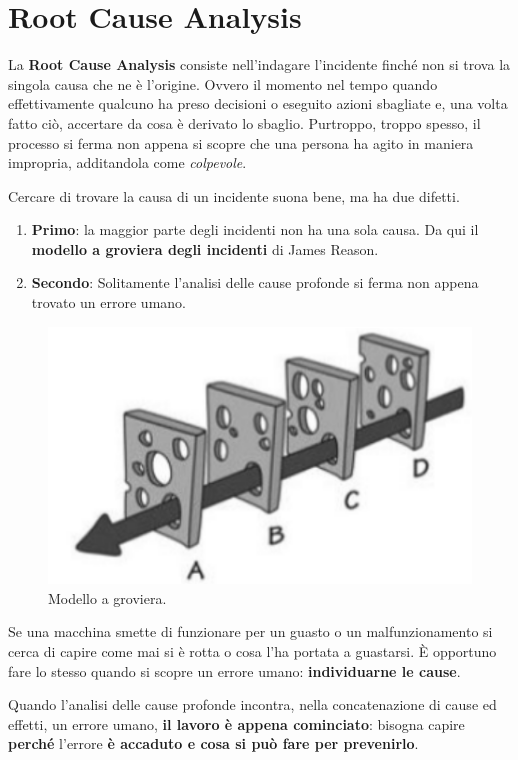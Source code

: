 \documentclass[a4paper,11pt,oneside]{book}
\begin{document}
\section{Root Cause Analysis}
La \textbf{Root Cause Analysis} consiste nell'indagare l'incidente finché non si trova la singola causa che ne è l'origine. Ovvero il momento nel tempo quando effettivamente qualcuno ha preso decisioni o eseguito azioni sbagliate e,
una volta fatto ciò, accertare da cosa è derivato lo sbaglio. Purtroppo, troppo spesso, il processo si ferma non appena si scopre che una persona ha agito in maniera impropria, additandola come \textit{colpevole}.

Cercare di trovare la causa di un incidente suona bene, ma ha due difetti.

\begin{enumerate}
	\item \textbf{Primo}: la maggior parte degli incidenti non ha una sola causa. Da qui il \textbf{modello a groviera degli incidenti} di James Reason.
	\item \textbf{Secondo}: Solitamente l'analisi delle cause profonde si ferma non appena trovato un errore umano.
\end{enumerate}

\pagebreak

\begin{figure}[!h]
	\centering
	\includegraphics[scale=0.55]{immagini/Groviera.png}
	\caption{Modello a groviera.}
\end{figure}

Se una macchina smette di funzionare per un guasto o un malfunzionamento
si cerca di capire come mai si è rotta o cosa l'ha portata a guastarsi. È
opportuno fare lo stesso quando si scopre un errore umano: \textbf{individuarne le cause}.

Quando l'analisi delle cause profonde incontra, nella concatenazione di cause ed effetti, un errore umano, \textbf{il lavoro è appena cominciato}: bisogna capire \textbf{perché} l'errore \textbf{è accaduto e cosa si può fare per prevenirlo}.
\end{document}
